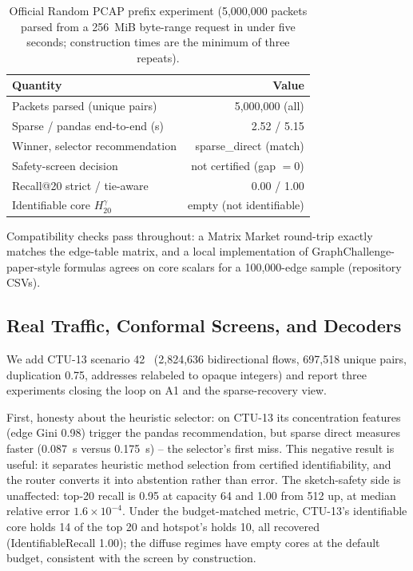 \documentclass[conference]{IEEEtran}
\begin{document}
\begin{table}[t]
\centering
\caption{Official Random PCAP prefix experiment (5{,}000{,}000 packets parsed from a 256~MiB byte-range request in under five seconds; construction times are the minimum of three repeats).}
\label{tab:real}
\begin{tabular}{lr}
\toprule
Quantity & Value \\
\midrule
Packets parsed (unique pairs) & 5{,}000{,}000 (all) \\
Sparse / pandas end-to-end (s) & 2.52 / 5.15 \\
Winner, selector recommendation & sparse\_direct (match) \\
Safety-screen decision & not certified (gap $=0$) \\
Recall@20 strict / tie-aware & 0.00 / 1.00 \\
Identifiable core $H_{20}^{\gamma}$ & empty (not identifiable) \\
\bottomrule
\end{tabular}
\end{table}

Compatibility checks pass throughout: a Matrix Market round-trip exactly matches the edge-table matrix, and a local implementation of GraphChallenge-paper-style formulas agrees on core scalars for a 100,000-edge sample (repository CSVs).

\subsection{Real Traffic, Conformal Screens, and Decoders}
We add CTU-13 scenario 42~\cite{garcia2014empirical} (2{,}824{,}636 bidirectional flows, 697{,}518 unique pairs, duplication 0.75, addresses relabeled to opaque integers) and report three experiments closing the loop on A1 and the sparse-recovery view.

First, honesty about the heuristic selector: on CTU-13 its concentration features (edge Gini 0.98) trigger the pandas recommendation, but sparse direct measures faster (0.087~s versus 0.175~s) -- the selector's first miss. This negative result is useful: it separates heuristic method selection from certified identifiability, and the router converts it into abstention rather than error. The sketch-safety side is unaffected: top-20 recall is 0.95 at capacity 64 and 1.00 from 512 up, at median relative error $1.6\times10^{-4}$. Under the budget-matched metric, CTU-13's identifiable core holds 14 of the top 20 and hotspot's holds 10, all recovered (IdentifiableRecall 1.00); the diffuse regimes have empty cores at the default budget, consistent with the screen by construction.
\end{document}
